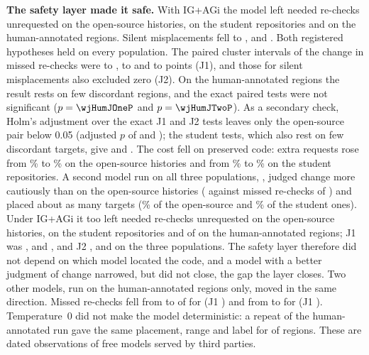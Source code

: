 \textbf{The safety layer made it safe.} With IG+AGi the model left \wjPubGiMissK{} needed re-checks unrequested on the open-source histories, \wjStuGiMissK{} on the student repositories and \wjHumGiMissK{} on the human-annotated regions. Silent misplacements fell to \wjPubGiSilentK{}, \wjStuGiSilentK{} and \wjHumGiSilentK{}. Both registered hypotheses held on every population. The paired cluster intervals of the change in missed re-checks were \wjPubJOneLo{} to \wjPubJOneHi{}, \wjStuJOneLo{} to \wjStuJOneHi{} and \wjHumJOneLo{} to \wjHumJOneHi{} points (J1), and those for silent misplacements also excluded zero (J2). On the human-annotated regions the result rests on few discordant regions, and the exact paired tests were not significant ($p=\wjHumJOneP$ and $p=\wjHumJTwoP$). As a secondary check, Holm's adjustment over the \wjHolmTests{} exact J1 and J2 tests leaves only the open-source pair below 0.05 (adjusted $p$ of \wjPubJOneHolm{} and \wjPubJTwoHolm{}); the student tests, which also rest on few discordant targets, give \wjStuJOneHolm{} and \wjStuJTwoHolm{}. The cost fell on preserved code: extra requests rose from \wjPubSelfFalse\% to \wjPubGiFalse\% on the open-source histories and from \wjStuSelfFalse\% to \wjStuGiFalse\% on the student repositories. A second model run on all three populations, \wjNemoModel{}, judged change more cautiously than \wjModel{} on the open-source histories (\wjNemoPubSelfMissK{} against \wjPubSelfMissK{} missed re-checks of \wjPubSelfMissN{}) and placed about as many targets (\wjNemoPubSelfPlace\% of the open-source and \wjNemoStuSelfPlace\% of the student ones). Under IG+AGi it too left \wjNemoPubGiMissK{} needed re-checks unrequested on the open-source histories, \wjNemoStuGiMissK{} on the student repositories and \wjNemoHumGiMissK{} of \wjNemoHumSelfMissN{} on the human-annotated regions; J1 was \wjNemoPubJOneSupported{}, \wjNemoStuJOneSupported{} and \wjNemoHumJOneSupported{}, and J2 \wjNemoPubJTwoSupported{}, \wjNemoStuJTwoSupported{} and \wjNemoHumJTwoSupported{} on the three populations. The safety layer therefore did not depend on which model located the code, and a model with a better judgment of change narrowed, but did not close, the gap the layer closes. Two other models, run on the human-annotated regions only, moved in the same direction. Missed re-checks fell from \wjStepHumSelfMissK{} to \wjStepHumGiMissK{} of \wjStepHumSelfMissN{} for \wjStepModel{} (J1 \wjStepHumJOneSupported{}) and from \wjStepFiveHumSelfMissK{} to \wjStepFiveHumGiMissK{} for \wjStepFiveModel{} (J1 \wjStepFiveHumJOneSupported{}). Temperature~0 did not make the model deterministic: a repeat of the human-annotated run gave the same placement, range and label for \wjRepSameAll{} of \wjRepN{} regions. These are dated observations of free models served by third parties.

